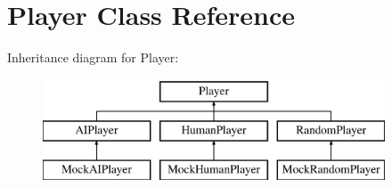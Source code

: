 \hypertarget{classPlayer}{}\section{Player Class Reference}
\label{classPlayer}
Inheritance diagram for Player\+:\begin{figure}[H]
\begin{center}
\leavevmode
\includegraphics[height=3.000000cm]{classPlayer}
\end{center}
\end{figure}
